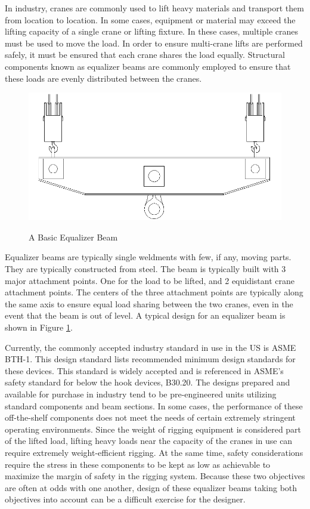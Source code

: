 
In industry, cranes are commonly used to lift heavy materials and transport them from location to location. In some cases, equipment or material may exceed the lifting capacity of a single crane or lifting fixture. In these cases, multiple cranes must be used to move the load. In order to ensure multi-crane lifts are performed safely, it must be ensured that each crane shares the load equally. Structural components known as equalizer beams are commonly employed to ensure that these loads are evenly distributed between the cranes. 


\begin{figure}
\includegraphics[width=\textwidth]{img/basic_eq_beam.png}
\label{img:basic_beam}
\caption{A Basic Equalizer Beam}
\end{figure}

Equalizer beams are typically single weldments with few, if any, moving parts. They are typically constructed from steel. The beam is typically built with 3 major attachment points. One for the load to be lifted, and 2 equidistant crane attachment points. The centers of the three attachment points are typically along the same axis to ensure equal load sharing between the two cranes, even in the event that the beam is out of level. A typical design for an equalizer beam is shown in Figure \ref{img:basic_beam}. 

Currently, the commonly accepted industry standard in use in the US is ASME BTH-1. This design standard lists recommended minimum design standards for these devices. This standard is widely accepted and is referenced in ASME's safety standard for below the hook devices, B30.20. The designs prepared and available for purchase in industry tend to be pre-engineered units utilizing standard components and beam sections. In some cases, the performance of these off-the-shelf components does not meet the needs of certain extremely stringent operating environments. Since the weight of rigging equipment is considered part of the lifted load, lifting heavy loads near the capacity of the cranes in use can require extremely weight-efficient rigging. At the same time, safety considerations require the stress in these components to be kept as low as achievable to maximize the margin of safety in the rigging system. Because these two objectives are often at odds with one another, design of these equalizer beams taking both objectives into account can be a difficult exercise for the designer. 

